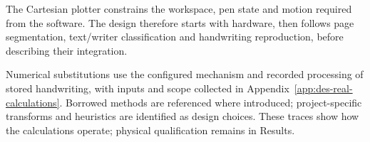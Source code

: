 \label{sec:design}
The Cartesian plotter constrains the workspace, pen state and motion required from the software. The design therefore starts with hardware, then follows page segmentation, text/writer classification and handwriting reproduction, before describing their integration.

Numerical substitutions use the configured mechanism and recorded processing of stored handwriting, with inputs and scope collected in Appendix~\ref{app:des-real-calculations}. Borrowed methods are referenced where introduced; project-specific transforms and heuristics are identified as design choices. These traces show how the calculations operate; physical qualification remains in Results.\par








